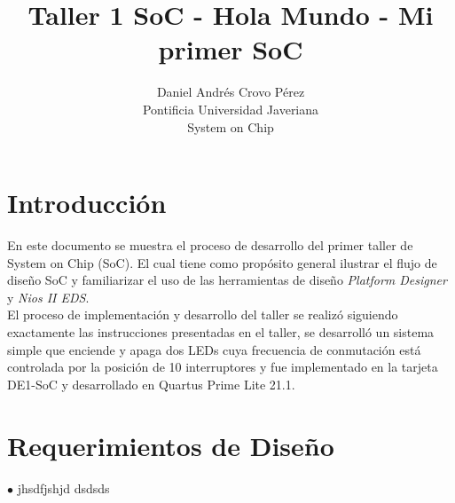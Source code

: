 \documentclass[]{article}
\title{Taller 1 SoC -  Hola Mundo - Mi primer SoC}
\author{Daniel Andrés Crovo Pérez \\
Pontificia Universidad Javeriana \\
System on Chip}
\begin{document}
\maketitle

\section{Introducción}
En este documento se muestra el proceso de desarrollo del primer taller de System on Chip (SoC). El cual tiene como propósito general ilustrar el flujo de diseño SoC y familiarizar el uso de las herramientas de diseño \textit{Platform Designer} y \textit{Nios II EDS}.  \\
El proceso de implementación y desarrollo del taller se realizó siguiendo exactamente las instrucciones presentadas en el taller,  se desarrolló un sistema simple que enciende y apaga dos LEDs cuya frecuencia de conmutación está controlada por la posición de 10 interruptores y fue implementado en la tarjeta DE1-SoC y desarrollado en Quartus Prime Lite 21.1.

\section{Requerimientos de Diseño}
$\bullet$ jhsdfjshjd
dsdsds
\end{document}
